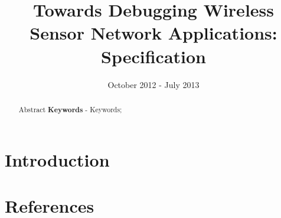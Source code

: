 \documentclass[a4paper]{article}
\title{Towards Debugging Wireless Sensor Network Applications: Specification}
\date{October 2012 - July 2013}
\author{}
\begin{document}
\maketitle

\pagestyle{empty}
\thispagestyle{empty}

\newpage

\begin{abstract}
Abstract
\newline
\newline
\noindent \textbf{Keywords} - Keywords;
\end{abstract}
\newpage


\pagestyle{plain}
\setcounter{page}{1}

\tableofcontents
\clearpage


\section{Introduction}

\clearpage


\appendixpage
\addappheadtotoc
\appendix


\section{References}
\renewcommand{\refname}{\vspace{-1cm}}


\end{document}
